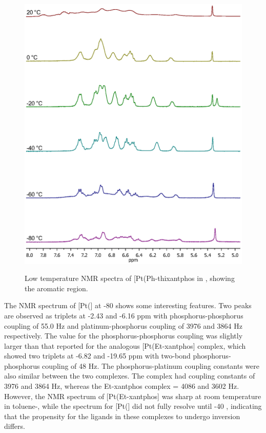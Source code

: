 \begin{figure}[htbp]
\begin{center}
\vspace{0.5cm}
\includegraphics[scale = 0.9, trim = 2cm 2.5cm 1.7cm 4cm, clip]{../NMR/1031.eps}
\caption[Low temperature \proton{} NMR spectra of [Pt(Ph-thixantphos\ce{)2}{]}]{Low temperature \proton{} NMR spectra of [Pt(Ph-thixantphos\ce{)2]} in , showing the aromatic region.}
\vspace{0.2cm}
\label{BisSPhPt:HNMR}
\end{center}
\end{figure}
\vspace{0.2cm}

The \phosphorus{} NMR spectrum of [Pt(\Phthixantphos{}] at -80 \degC{} shows some interesting features.  Two peaks are observed as triplets at -2.43 and -6.16 ppm with phosphorus-phosphorus coupling of 55.0 Hz and platinum-phosphorus coupling of 3976 and 3864 Hz respectively.  The value for the phosphorus-phosphorus coupling was slightly larger than that reported for the analogous [Pt(Et-xantphos] complex, which showed two triplets at -6.82 and -19.65 ppm with two-bond phosphorus-phosphorus coupling of 48 Hz.\cite{Miedaner2004}  The phosphorus-platinum coupling constants were also similar between the two complexes.  The \Phthixantphos{} complex had coupling constants of 3976 and 3864 Hz, whereas the Et-xantphos complex \JPtP{}  = 4086 and 3602 Hz.  However, the \phosphorus{} NMR spectrum of [Pt(Et-xantphos] was sharp at room temperature in toluene-, while the spectrum for [Pt(\Phthixantphos{}] did not fully resolve until -40 \degC{}, indicating that the propensity for the ligands in these complexes to undergo inversion differs.\cite{Miedaner2004}

